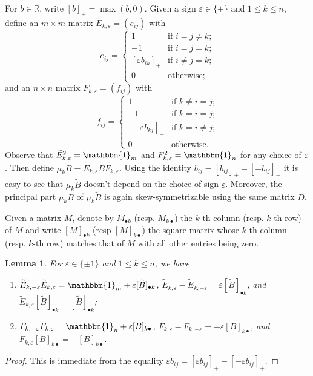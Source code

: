 \documentclass{amsart}
\newtheorem{lemma}[theorem]{Lemma}
\numberwithin{theorem}{section}
\newcommand{\bfb}{{\boldsymbol{b}}}
\newcommand{\RR}{\mathbb{R}}
\newcommand{\bOne}{\mathbbm{1}}
\begin{document}
  For $b\in\RR$, write $[b]_+=\max(b,0)$.
  Given a sign $\varepsilon\in\{\pm\}$ and $1\le k\le n$, define an $m\times m$ matrix $\widetilde E_{k,\varepsilon}=(e_{ij})$ with
  \begin{equation}
    \label{e:left mutation matrix}
    e_{ij}=\begin{cases} 1 & \text{if $i=j\ne k$;}\\ -1 & \text{if $i=j=k$;}\\ [\varepsilon b_{ik}]_+ & \text{if $i\ne j=k$;}\\ 0 & \text{otherwise;} \end{cases}
  \end{equation}
  and an $n\times n$ matrix $F_{k,\varepsilon}=(f_{ij})$ with
  \begin{equation}
    \label{eq:right mutation matrix}
    f_{ij}=\begin{cases} 1 & \text{if $k\ne i=j$;}\\ -1 & \text{if $k=i=j$;}\\ [-\varepsilon b_{kj}]_+ & \text{if $k=i\ne j$;}\\ 0 & \text{otherwise.} \end{cases}
  \end{equation}
  Observe that $\widetilde E^2_{k,\varepsilon}=\bOne_m$ and $F^2_{k,\varepsilon}=\bOne_n$ for any choice of $\varepsilon$.
  Then define $\mu_k\widetilde B=\widetilde E_{k,\varepsilon} \widetilde B F_{k,\varepsilon}$.
  Using the identity $b_{ij}=[b_{ij}]_+-[-b_{ij}]_+$ it is easy to see that $\mu_k\widetilde B$ doesn't depend on the choice of sign $\varepsilon$.
  Moreover, the principal part $\mu_k B$ of $\mu_k\widetilde B$ is again skew-symmetrizable using the same matrix $D$.

  Given a matrix $M$, denote by $M_{\bullet k}$ (resp. $M_{k \bullet}$) the $k$-th column (resp. $k$-th row) of $M$ and write $[M]_{\bullet k}$ (resp $[M]_{k\bullet}$)  the square matrix whose $k$-th column (resp. $k$-th row) matches that of $M$ with all other entries being zero.
  \begin{lemma}
    For $\varepsilon\in\{\pm1\}$ and $1\le k \le n$, we have 
    \begin{enumerate}
      \item $\widetilde E_{k,-\varepsilon} \widetilde E_{k,\varepsilon} = \bOne_m + \varepsilon [\widetilde B]_{\bullet k}$, $\widetilde E_{k,\varepsilon} - \widetilde E_{k,-\varepsilon} = \varepsilon [\widetilde B]_{\bullet k}$, and $\widetilde E_{k,\varepsilon} [\widetilde B]_{\bullet k} = [\widetilde B]_{\bullet k}$;
      \item $F_{k,-\varepsilon} F_{k,\varepsilon} = \bOne_n + \varepsilon [B]_{k \bullet}$, $F_{k,\varepsilon} - F_{k,-\varepsilon} = -\varepsilon [B]_{k \bullet}$, and $F_{k,\varepsilon} [B]_{k \bullet} = -[B]_{k \bullet}$.
    \end{enumerate}
  \end{lemma}
  \begin{proof}
    This is immediate from the equality $\varepsilon b_{ij}=[\varepsilon b_{ij}]_+-[-\varepsilon b_{ij}]_+$.
  \end{proof}
\end{document}
